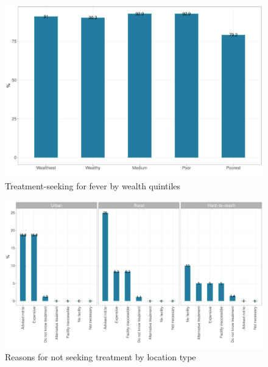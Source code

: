 \documentclass[12pt,a4paper]{article}
\begin{document}
\begin{figure}[H]

{\centering \includegraphics{kayinReport_files/figure-latex/fever2plot-1} 

}

\caption{Treatment-seeking for fever by wealth quintiles}\label{fig:fever2plot}
\end{figure}

\begin{figure}[H]

{\centering \includegraphics{kayinReport_files/figure-latex/fever4plot-1} 

}

\caption{Reasons for not seeking treatment by location type}\label{fig:fever4plot}
\end{figure}
\end{document}
